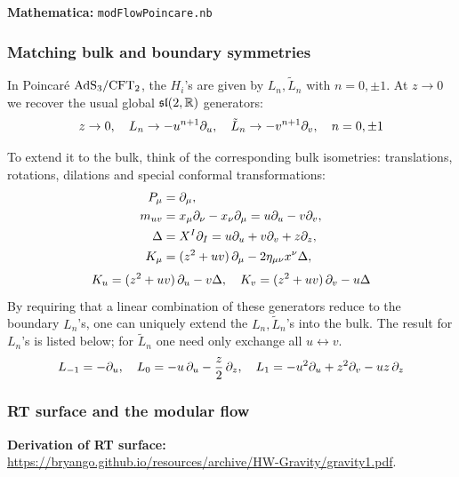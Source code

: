 \documentclass[11pt,a4paper]{article}
\begin{document}
\noindent\textbf{Mathematica:} \texttt{modFlowPoincare.nb}

\subsubsection{Matching bulk and boundary symmetries}
	In Poincar\'e $\mathrm{AdS}_3/\mathrm{CFT}_2$, the $H_i$'s are given by $L_n,\tilde{L}_n$ with $n=0,\pm 1$. At $z\to 0$ we recover the usual global $\mathfrak{sl}(2,\mathbb{R})$ generators:
	\begin{equation}
		z\to 0,
	\quad
		      L_n \to -u^{n+1} \partial_{u},\quad
		\tilde{L}_n \to -v^{n+1} \partial_{v},\quad
	n = 0,\pm 1
	\end{equation}
	
	To extend it to the bulk, think of the corresponding bulk isometries: translations, rotations, dilations and special conformal transformations:
	\begin{equation}
	\begin{aligned}
		P_\mu
		&= \partial_{\mu},\\
		m_{uv}
		&= x_\mu \partial_{\nu} - x_\nu \partial_{\mu}
		= u\partial_{u} - v\partial_{v},\\
		\Delta
		&= X^I \partial_{I}
		= u\partial_{u} + v\partial_{v} + z\partial_{z},\\
		K_\mu
		&= (z^2 + uv)\,\partial_{\mu}
			- 2\eta_{\mu\nu} x^\nu \Delta,
	\end{aligned}
	\end{equation}
	\begin{equation}
		K_u = (z^2 + uv)\,\partial_{u} - v \Delta,
	\quad
		K_v = (z^2 + uv)\,\partial_{v} - u \Delta
	\end{equation}
	By requiring that a linear combination of these generators reduce to the boundary $L_n$'s, one can uniquely extend the $L_n,\tilde{L}_n$'s into the bulk. The result for $L_n$'s is listed below; for $\tilde{L}_n$ one need only exchange all $u\leftrightarrow v$.
	\begin{equation}
		L_{-1} = -\partial_{u},
	\quad
		L_0 = -u\,\partial_{u} - \frac{z}{2}\,\partial_{z},
	\quad
		L_1 = -u^2\partial_{u} + z^2 \partial_{v}
			- uz\,\partial_{z}
	\end{equation}

\subsubsection{RT surface and the modular flow}

\textbf{Derivation of RT surface:} \\
 \url{https://bryango.github.io/resources/archive/HW-Gravity/gravity1.pdf}. 
\end{document}
